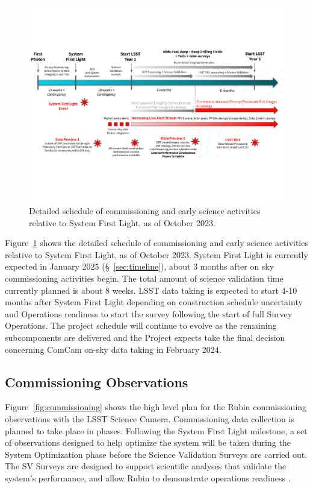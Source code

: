 \begin{figure}[htb]
\centering
\includegraphics[width=0.98\linewidth]{figures/rubinobs_on-sky_commissioning_and_early_science.pdf}
\caption{Detailed schedule of commissioning  and early science activities relative to System First Light, as of October 2023.}
\label{fig:commissioning-es-schedule}
\vspace{0.1cm}
\end{figure}

Figure~\ref{fig:commissioning-es-schedule} shows the detailed schedule of commissioning and early science activities relative to System First Light, as of October 2023.
System First Light is currently expected in January 2025 (\S~\ref{sec:timeline}), about 3 months after on sky commissioning activities begin.
The total amount of science validation time currently planned is about 8 weeks.  
LSST data taking is expected to start 4-10 months after System First Light depending on construction schedule uncertainty and Operations readiness to start the survey following the start of full Survey Operations.
The project schedule will continue to evolve as the remaining subcomponents are delivered and the Project expects take the final decision concerning ComCam on-sky data taking in February 2024.

\subsection{Commissioning Observations}
\label{ssec:commissioning-observations}

Figure~\ref{fig:commissioning} shows the high level plan for the Rubin commissioning observations with the LSST Science Camera.
Commissioning data collection is planned to take place in phases.
Following the System First Light milestone, a set of observations designed to help optimize the system will be taken during the System Optimization phase before the Science Validation Surveys are carried out. 
The SV Surveys are designed to support scientific analyses that validate the system's performance, and allow Rubin to demonstrate operations readiness .

